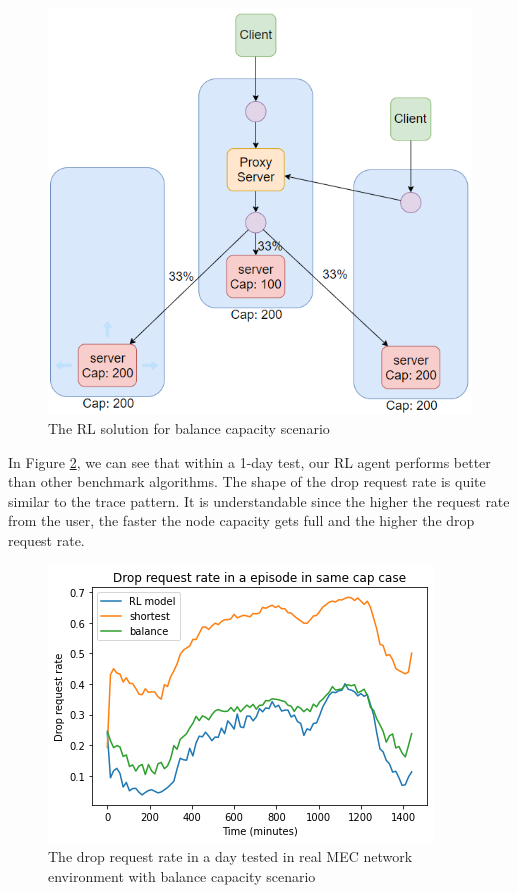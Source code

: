 \documentclass[conference]{IEEEtran}
\begin{document}
\begin{figure}[]
    \centering
    \includegraphics[scale = 0.5]{imgs/balance_capacity_RL_solution.png}
    \caption{The RL solution for balance capacity scenario}
    \label{fig:balance_capacity_RL_solution}
\end{figure}

In Figure \ref{fig:balance_capacity_scenario_result}, we can see that within a 1-day test, our RL agent performs better than other benchmark algorithms. The shape of the drop request rate is quite similar to the trace pattern. It is understandable since the higher the request rate from the user, the faster the node capacity gets full and the higher the drop request rate.

\begin{figure}[]
    \centering
    \includegraphics[scale = 0.5]{imgs/balance_capacity_scenario_result.png}
    \caption{The drop request rate in a day tested in real MEC network environment with balance capacity scenario}
    \label{fig:balance_capacity_scenario_result}
\end{figure}
\end{document}
